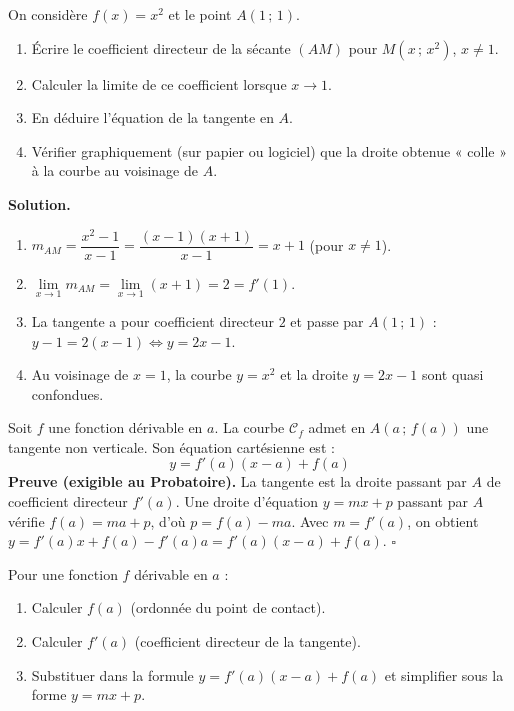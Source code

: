 \documentclass[11pt]{article}
\providecommand{\qed}{\hfill$\square$}
\begin{document}
\begin{experience}
On considère $f(x)=x^2$ et le point $A(1\,;\,1)$.
\begin{enumerate}
  \item Écrire le coefficient directeur de la sécante $(AM)$ pour $M(x\,;\,x^2)$, $x \neq 1$.
  \item Calculer la limite de ce coefficient lorsque $x \to 1$.
  \item En déduire l'équation de la tangente en $A$.
  \item Vérifier graphiquement (sur papier ou logiciel) que la droite obtenue « colle » à la courbe au voisinage de $A$.
\end{enumerate}
\tcblower
\textbf{Solution.}
\begin{enumerate}
  \item $m_{AM} = \dfrac{x^2-1}{x-1} = \dfrac{(x-1)(x+1)}{x-1} = x+1$ (pour $x \neq 1$).
  \item $\lim\limits_{x \to 1} m_{AM} = \lim\limits_{x \to 1} (x+1) = 2 = f'(1)$.
  \item La tangente a pour coefficient directeur $2$ et passe par $A(1\,;\,1)$ : $y-1 = 2(x-1) \iff y = 2x-1$.
  \item Au voisinage de $x=1$, la courbe $y=x^2$ et la droite $y=2x-1$ sont quasi confondues.
\end{enumerate}
\end{experience}

\begin{propriete}
Soit $f$ une fonction dérivable en $a$. La courbe $\mathcal{C}_f$ admet en $A(a\,;\,f(a))$ une tangente non verticale. Son équation cartésienne est :
\[
\boxed{\,y = f'(a)(x-a) + f(a)\,}
\]
\textbf{Preuve (exigible au Probatoire).} La tangente est la droite passant par $A$ de coefficient directeur $f'(a)$. Une droite d'équation $y = mx + p$ passant par $A$ vérifie $f(a) = m a + p$, d'où $p = f(a) - m a$. Avec $m = f'(a)$, on obtient $y = f'(a)x + f(a) - f'(a)a = f'(a)(x-a) + f(a)$. \qed
\end{propriete}

\begin{methode}
Pour une fonction $f$ dérivable en $a$ :
\begin{enumerate}
  \item Calculer $f(a)$ (ordonnée du point de contact).
  \item Calculer $f'(a)$ (coefficient directeur de la tangente).
  \item Substituer dans la formule $y = f'(a)(x-a) + f(a)$ et simplifier sous la forme $y = mx + p$.
\end{enumerate}
\end{methode}
\end{document}
